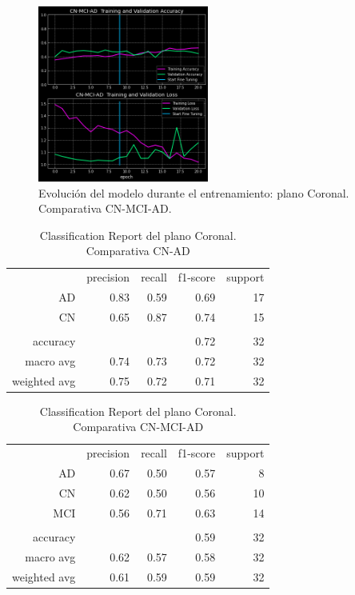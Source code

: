 \begin{figure}[H]
    \centering
    \includegraphics[width=0.5\textwidth]{./imgs/resultados/coronal/CN_MCI_AD_output_CORONAL}
    \caption{Evolución del modelo durante el entrenamiento: plano Coronal. Comparativa CN-MCI-AD. }
    \label{fig:coronal-c-mci-ad}
\end{figure}

\begin{table}[H]
    \centering
    \begin{tabular}{r r r r r}
        & precision & recall & f1-score & support \\
        AD & 0.83 & 0.59 & 0.69 & 17 \\
        CN & 0.65 & 0.87 & 0.74 & 15 \\
        & & & & \\
        accuracy &  &  & 0.72 & 32 \\
        macro avg & 0.74 & 0.73 & 0.72 & 32 \\
        weighted avg & 0.75 & 0.72 & 0.71 & 32 \\
    \end{tabular}
    \caption{Classification Report del plano Coronal. Comparativa CN-AD}
    \label{tab:cr-coronal-cn-ad}
\end{table}

\begin{table}[H]
    \centering
    \begin{tabular}{r r r r r}
        & precision & recall & f1-score & support \\
        AD & 0.67 & 0.50 & 0.57 & 8 \\
        CN & 0.62 & 0.50 & 0.56 & 10 \\
        MCI & 0.56 & 0.71 & 0.63 & 14 \\
        & & & & \\
        accuracy &  &  & 0.59 & 32 \\
        macro avg & 0.62 & 0.57 & 0.58 & 32 \\
        weighted avg & 0.61 & 0.59 & 0.59 & 32 \\
    \end{tabular}
    \caption{Classification Report del plano Coronal. Comparativa CN-MCI-AD}
    \label{tab:cr-coronal-cn-mci-ad}
\end{table}

